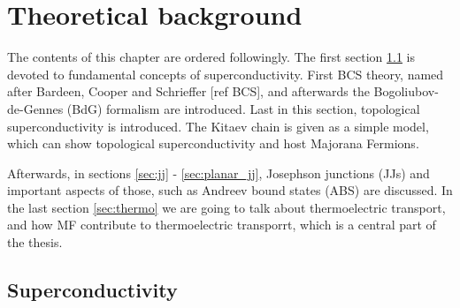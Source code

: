 \chapter{Theoretical background}
\label{ch:theory}

The contents of this chapter are ordered followingly. The first section \ref{sec:sc} is devoted to fundamental concepts of superconductivity. First BCS theory, named after Bardeen, Cooper and Schrieffer [ref BCS], and afterwards the Bogoliubov-de-Gennes (BdG) formalism are introduced. Last in this section, topological superconductivity is introduced. The Kitaev chain is given as a simple model, which can show topological superconductivity and host Majorana Fermions. 

Afterwards, in sections \ref{sec:jj} - \ref{sec:planar_jj}, Josephson junctions (JJs) and important aspects of those, such as Andreev bound states (ABS) are discussed. In the last section \ref{sec:thermo} we are going to talk about thermoelectric transport, and how MF contribute to thermoelectric transporrt, which is a central part of the thesis. 

\section{Superconductivity}
\label{sec:sc}
